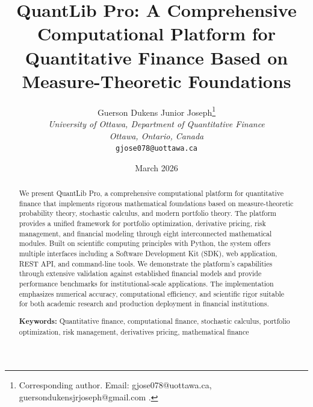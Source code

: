 \documentclass[12pt,a4paper]{article}
\title{QuantLib Pro: A Comprehensive Computational Platform for Quantitative Finance Based on Measure-Theoretic Foundations}
\author{
    Guerson Dukens Junior Joseph\footnote{Corresponding author. Email: gjose078@uottawa.ca, guersondukensjrjoseph@gmail.com \citep{joseph2026author}.} \\
    \textit{University of Ottawa, Department of Quantitative Finance} \\
    \textit{Ottawa, Ontario, Canada} \\
    \texttt{gjose078@uottawa.ca}
}
\date{March 2026}
\theoremstyle{definition}
\theoremstyle{remark}
\begin{document}
\maketitle


\begin{abstract}
We present QuantLib Pro, a comprehensive computational platform for quantitative finance that implements rigorous mathematical foundations based on measure-theoretic probability theory, stochastic calculus, and modern portfolio theory. The platform provides a unified framework for portfolio optimization, derivative pricing, risk management, and financial modeling through eight interconnected mathematical modules. Built on scientific computing principles with Python, the system offers multiple interfaces including a Software Development Kit (SDK), web application, REST API, and command-line tools. We demonstrate the platform's capabilities through extensive validation against established financial models and provide performance benchmarks for institutional-scale applications. The implementation emphasizes numerical accuracy, computational efficiency, and scientific rigor suitable for both academic research and production deployment in financial institutions.

\textbf{Keywords:} Quantitative finance, computational finance, stochastic calculus, portfolio optimization, risk management, derivatives pricing, mathematical finance
\end{abstract}

\clearpage
\tableofcontents

\clearpage
{}
\listoffigures

\clearpage
{}
\listoftables

\clearpage
\end{document}
